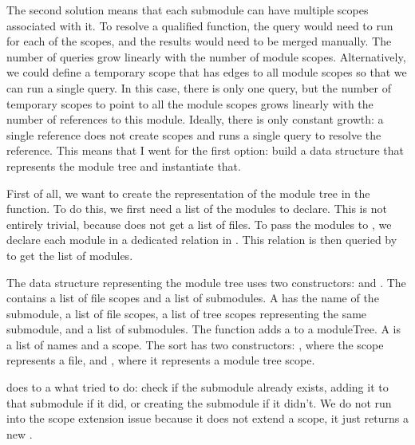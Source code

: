 The second solution means that each submodule can have multiple scopes associated with it.
To resolve a qualified function, the query would need to run for each of the scopes, and the results would need to be merged manually.
The number of queries grow linearly with the number of module scopes.
Alternatively, we could define a temporary scope that has  edges to all module scopes so that we can run a single query.
In this case, there is only one query, but the number of temporary scopes to point to all the module scopes grows linearly with the number of references to this module.
Ideally, there is only constant growth: a single reference does not create scopes and runs a single query to resolve the reference.
This means that I went for the first option: build a data structure that represents the module tree and instantiate that.

First of all, we want to create the representation of the module tree in the  function.
To do this, we first need a list of the modules to declare.
This is not entirely trivial, because  does not get a list of files.
To pass the modules to , we declare each module in a dedicated relation  in .
This relation is then queried by  to get the list of modules.

The data structure representing the module tree uses two constructors:  and .
The  contains a list of file scopes and a list of submodules.
A  has the name of the submodule, a list of file scopes, a list of tree scopes representing the same submodule, and a list of submodules.
The function  adds a  to a moduleTree.
A  is a list of names and a scope.
The sort  has two constructors: , where the scope represents a file, and , where it represents a module tree scope.

 does to a  what  tried to do: check if the submodule already exists, adding it to that submodule if it did, or creating the submodule if it didn't.
We do not run into the scope extension issue because it does not extend a scope, it just returns a new .

